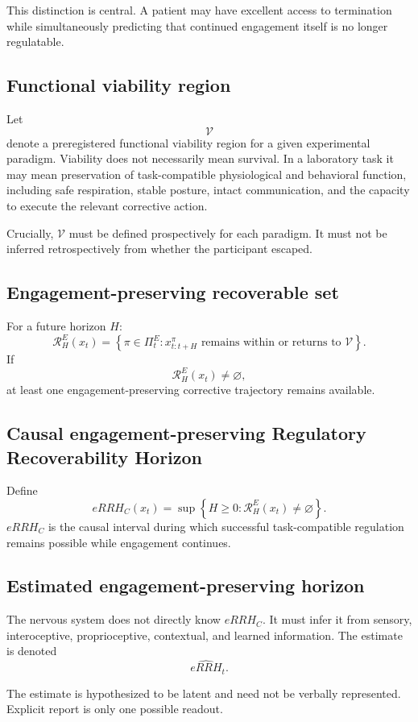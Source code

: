 \documentclass[9pt,twocolumn]{article}
\begin{document}
This distinction is central. A patient may have excellent access to termination while simultaneously predicting that continued engagement itself is no longer regulatable.

\subsection{Functional viability region}
Let
\[
\mathcal V
\]
denote a preregistered functional viability region for a given experimental paradigm. Viability does not necessarily mean survival. In a laboratory task it may mean preservation of task-compatible physiological and behavioral function, including safe respiration, stable posture, intact communication, and the capacity to execute the relevant corrective action.

Crucially, $\mathcal V$ must be defined prospectively for each paradigm. It must not be inferred retrospectively from whether the participant escaped.

\subsection{Engagement-preserving recoverable set}
For a future horizon $H$:
\[
\mathcal R_H^{E}(x_t)=\left\{\pi\in\Pi_t^{E}:x_{t:t+H}^{\pi}\text{ remains within or returns to }\mathcal V\right\}.
\]
If
\[
\mathcal R_H^{E}(x_t)\neq\varnothing,
\]
at least one engagement-preserving corrective trajectory remains available.

\subsection{Causal engagement-preserving Regulatory Recoverability Horizon}
Define
\[
eRRH_C(x_t)=\sup\left\{H\ge0:\mathcal R_H^{E}(x_t)\neq\varnothing\right\}.
\]
$eRRH_C$ is the causal interval during which successful task-compatible regulation remains possible while engagement continues.

\subsection{Estimated engagement-preserving horizon}
The nervous system does not directly know $eRRH_C$. It must infer it from sensory, interoceptive, proprioceptive, contextual, and learned information. The estimate is denoted
\[
\widehat{eRRH}_t.
\]

The estimate is hypothesized to be latent and need not be verbally represented. Explicit report is only one possible readout.
\end{document}
